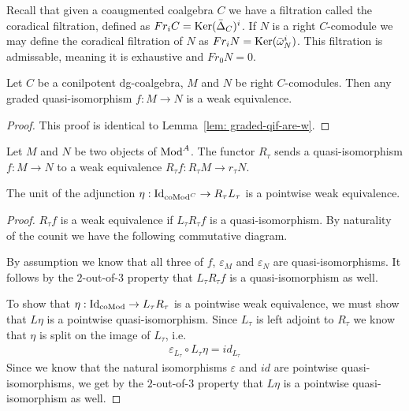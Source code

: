 \documentclass[../thesis.tex]{subfiles}
\begin{document}
            Recall that given a coaugmented coalgebra $C$ we have a filtration called the coradical filtration, defined as $Fr_iC = \tt{Ker}(\bar{\Delta}_C)^i$. If $N$ is a right $C$-comodule we may define the coradical filtration of $N$ as $Fr_iN = \tt{Ker}(\bar{\omega}_N^i)$. This filtration is admissable, meaning it is exhaustive and $Fr_0N=0$.

            \begin{lemma}
                Let $C$ be a conilpotent dg-coalgebra, $M$ and $N$ be right $C$-comodules. Then any graded quasi-isomorphism $f: M \rightarrow N$ is a weak equivalence.
            \end{lemma}

            \begin{proof}
                This proof is identical to Lemma~\ref{lem: graded-qif-are-w}.   
            \end{proof}

            \begin{lemma}
                Let $M$ and $N$ be two objects of $\tt{Mod}^A$. The functor $R_\tau$ sends a quasi-isomorphism $f: M \rightarrow N$ to a weak equivalence $R_\tau f: R_\tau M \rightarrow r_\tau N$.

                The unit of the adjunction $\eta : \tt{Id}_{\tt{coMod}^C} \rightarrow R_\tau L_\tau$ is a pointwise weak equivalence.
            \end{lemma}

            \begin{proof}
                $R_\tau f$ is a weak equivalence if $L_\tau R_\tau f$ is a quasi-isomorphism. By naturality of the counit we have the following commutative diagram.
                \begin{center}
                \end{center}

                By assumption we know that all three of $f$, $\varepsilon_M$ and $\varepsilon_N$ are quasi-isomorphisms. It follows by the $2$-out-of-$3$ property that $L_\tau R_\tau f$ is a quasi-isomorphism as well.

                To show that $\eta : \tt{Id}_{\tt{coMod}} \rightarrow L_\tau R_\tau$ is a pointwise weak equivalence, we must show that $L\eta$ is a pointwise quasi-isomorphism. Since $L_\tau$ is left adjoint to $R_\tau$ we know that $\eta$ is split on the image of $L_\tau$, i.e.
                \begin{align*}
                    \varepsilon_{L_\tau}\circ L_\tau\eta = id_{L_\tau}
                \end{align*}
                Since we know that the natural isomorphisms $\varepsilon$ and $id$ are pointwise quasi-isomorphisms, we get by the $2$-out-of-$3$ property that $L\eta$ is a pointwise quasi-isomorphism as well.
            \end{proof}
\end{document}
